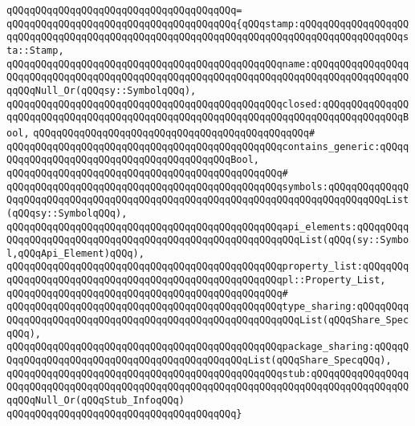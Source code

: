 \verb|qQQqqQQqqQQqqQQqqQQqqQQqqQQqqQQqqQQqqQQq=|\newline
\verb|qQQqqQQqqQQqqQQqqQQqqQQqqQQqqQQqqQQqqQQq{qQQqstamp:qQQqqQQqqQQqqQQqqQQqqQQqqQQqqQQqqQQqqQQqqQQqqQQqqQQqqQQqqQQqqQQqqQQqqQQqqQQqqQQqqQQqqQQqsta::Stamp,|\newline
\verb|qQQqqQQqqQQqqQQqqQQqqQQqqQQqqQQqqQQqqQQqqQQqqQQqname:qQQqqQQqqQQqqQQqqQQqqQQqqQQqqQQqqQQqqQQqqQQqqQQqqQQqqQQqqQQqqQQqqQQqqQQqqQQqqQQqqQQqqQQqqQQqNull_Or(qQQqsy::SymbolqQQq),|\newline
\verb|qQQqqQQqqQQqqQQqqQQqqQQqqQQqqQQqqQQqqQQqqQQqqQQqclosed:qQQqqQQqqQQqqQQqqQQqqQQqqQQqqQQqqQQqqQQqqQQqqQQqqQQqqQQqqQQqqQQqqQQqqQQqqQQqqQQqqQQqBool,|\newline
\verb|qQQqqQQqqQQqqQQqqQQqqQQqqQQqqQQqqQQqqQQqqQQqqQQq#|\newline
\verb|qQQqqQQqqQQqqQQqqQQqqQQqqQQqqQQqqQQqqQQqqQQqqQQqcontains_generic:qQQqqQQqqQQqqQQqqQQqqQQqqQQqqQQqqQQqqQQqqQQqBool,|\newline
\verb|qQQqqQQqqQQqqQQqqQQqqQQqqQQqqQQqqQQqqQQqqQQqqQQq#|\newline
\verb|qQQqqQQqqQQqqQQqqQQqqQQqqQQqqQQqqQQqqQQqqQQqqQQqsymbols:qQQqqQQqqQQqqQQqqQQqqQQqqQQqqQQqqQQqqQQqqQQqqQQqqQQqqQQqqQQqqQQqqQQqqQQqqQQqqQQqList(qQQqsy::SymbolqQQq),|\newline
\verb|qQQqqQQqqQQqqQQqqQQqqQQqqQQqqQQqqQQqqQQqqQQqqQQqapi_elements:qQQqqQQqqQQqqQQqqQQqqQQqqQQqqQQqqQQqqQQqqQQqqQQqqQQqqQQqqQQqList(qQQq(sy::Symbol,qQQqApi_Element)qQQq),|\newline
\verb|qQQqqQQqqQQqqQQqqQQqqQQqqQQqqQQqqQQqqQQqqQQqqQQqproperty_list:qQQqqQQqqQQqqQQqqQQqqQQqqQQqqQQqqQQqqQQqqQQqqQQqqQQqqQQqpl::Property_List,|\newline
\verb|qQQqqQQqqQQqqQQqqQQqqQQqqQQqqQQqqQQqqQQqqQQqqQQq#|\newline
\verb|qQQqqQQqqQQqqQQqqQQqqQQqqQQqqQQqqQQqqQQqqQQqqQQqtype_sharing:qQQqqQQqqQQqqQQqqQQqqQQqqQQqqQQqqQQqqQQqqQQqqQQqqQQqqQQqqQQqList(qQQqShare_SpecqQQq),|\newline
\verb|qQQqqQQqqQQqqQQqqQQqqQQqqQQqqQQqqQQqqQQqqQQqqQQqpackage_sharing:qQQqqQQqqQQqqQQqqQQqqQQqqQQqqQQqqQQqqQQqqQQqqQQqList(qQQqShare_SpecqQQq),|\newline
\verb|qQQqqQQqqQQqqQQqqQQqqQQqqQQqqQQqqQQqqQQqqQQqqQQqstub:qQQqqQQqqQQqqQQqqQQqqQQqqQQqqQQqqQQqqQQqqQQqqQQqqQQqqQQqqQQqqQQqqQQqqQQqqQQqqQQqqQQqqQQqqQQqNull_Or(qQQqStub_InfoqQQq)|\newline
\verb|qQQqqQQqqQQqqQQqqQQqqQQqqQQqqQQqqQQqqQQq}|\newline
\newline
